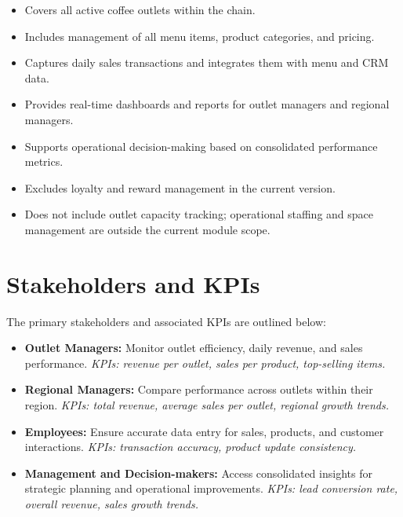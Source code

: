 \begin{itemize}
    \item Covers all active coffee outlets within the chain.
    \item Includes management of all menu items, product categories, and pricing.
    \item Captures daily sales transactions and integrates them with menu and CRM data.
    \item Provides real-time dashboards and reports for outlet managers and regional managers.
    \item Supports operational decision-making based on consolidated performance metrics.
    \item Excludes loyalty and reward management in the current version.
    \item Does not include outlet capacity tracking; operational staffing and space management are outside the current module scope.
\end{itemize}

\vspace{1em}

\section*{Stakeholders and KPIs}

The primary stakeholders and associated KPIs are outlined below:

\begin{itemize}
    \item \textbf{Outlet Managers:} Monitor outlet efficiency, daily revenue, and sales performance.  
          \textit{KPIs: revenue per outlet, sales per product, top-selling items.}
    \item \textbf{Regional Managers:} Compare performance across outlets within their region.  
          \textit{KPIs: total revenue, average sales per outlet, regional growth trends.}
    \item \textbf{Employees:} Ensure accurate data entry for sales, products, and customer interactions.  
          \textit{KPIs: transaction accuracy, product update consistency.}
    \item \textbf{Management and Decision-makers:} Access consolidated insights for strategic planning and operational improvements.  
          \textit{KPIs: lead conversion rate, overall revenue, sales growth trends.}
\end{itemize}

\vspace{1em}

